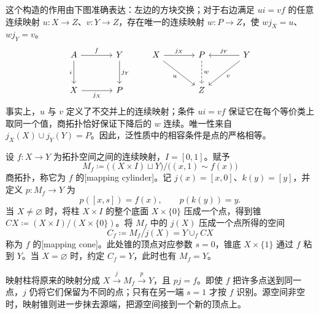 这个构造的作用由下图准确表达：左边的方块交换；对于右边满足 \(ui=vf\) 的任意连续映射 \(u:X\to Z\)、\(v:Y\to Z\)，存在唯一的连续映射 \(w:P\to Z\)，使 \(wj_X=u\)、\(wj_Y=v\)。
\[
	\begin{tikzcd}[column sep=large,row sep=large]
		A \arrow[r,"f"] \arrow[d,"i"'] & Y \arrow[d,"j_Y"] \\
		X \arrow[r,"j_X"'] & P
	\end{tikzcd}
	\qquad
	\begin{tikzcd}[column sep=large,row sep=large]
		X \arrow[r,"j_X"] \arrow[dr,"u"'] & P \arrow[d,dashed,"w"] & Y \arrow[l,"j_Y"'] \arrow[dl,"v"] \\
		& Z &
	\end{tikzcd}
\]
事实上，\(u\) 与 \(v\) 定义了不交并上的连续映射；条件 \(ui=vf\) 保证它在每个等价类上取同一个值，商拓扑恰好保证下降后的 \(w\) 连续。唯一性来自 \(j_X(X)\cup j_Y(Y)=P\)。因此，泛性质中的相容条件是点的严格相等。

\begin{definition}[映射柱与映射锥]\label{g2:def:mapping-cylinder-cone}
	设 \(f:X\to Y\) 为拓扑空间之间的连续映射，\(I=[0,1]\)。赋予
	\[
		M_f\coloneqq\bigl((X\times I)\sqcup Y\bigr)/\bigl((x,1)\sim f(x)\bigr)
	\]
	商拓扑，称它为 \(f\) 的[mapping cylinder]。记 \(j(x)=[x,0]\)、\(k(y)=[y]\)，并定义 \(p:M_f\to Y\) 为
	\[
		p([x,s])=f(x),\qquad p(k(y))=y.
	\]
	当 \(X\ne\varnothing\) 时，将柱 \(X\times I\) 的整个底面 \(X\times\{0\}\) 压成一个点，得到锥 \(CX\coloneqq(X\times I)/(X\times\{0\})\)。将 \(M_f\) 中的 \(j(X)\) 压成一个点所得的空间
	\[
		C_f\coloneqq M_f/j(X)=Y\cup_f CX
	\]
	称为 \(f\) 的[mapping cone]。此处锥的顶点对应参数 \(s=0\)，锥底 \(X\times\{1\}\) 通过 \(f\) 粘到 \(Y\)。当 \(X=\varnothing\) 时，约定 \(C_f=Y\)，此时也有 \(M_f=Y\)。
\end{definition}

映射柱将原来的映射分成 \(X\xrightarrow{j}M_f\xrightarrow{p}Y\)，且 \(pj=f\)。即使 \(f\) 把许多点送到同一点，\(j\) 仍将它们保留为不同的点；只有在另一端 \(s=1\) 才按 \(f\) 识别。源空间非空时，映射锥则进一步抹去源端，把源空间接到一个新的顶点上。

